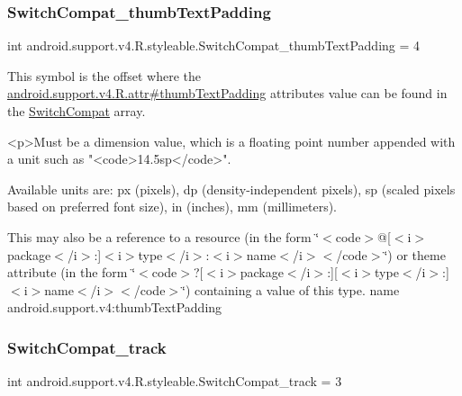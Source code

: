 \subsubsection{\texorpdfstring{Switch\+Compat\+\_\+thumb\+Text\+Padding}{SwitchCompat\_thumbTextPadding}}
{\footnotesize\ttfamily int android.\+support.\+v4.\+R.\+styleable.\+Switch\+Compat\+\_\+thumb\+Text\+Padding = 4\hspace{0.3cm}{\ttfamily [static]}}

This symbol is the offset where the \hyperlink{classandroid_1_1support_1_1v4_1_1R_1_1attr_abc9134fe1050fd996d652ba07079076f}{android.\+support.\+v4.\+R.\+attr\#thumb\+Text\+Padding} attribute\textquotesingle{}s value can be found in the \hyperlink{classandroid_1_1support_1_1v4_1_1R_1_1styleable_a3b46a9ea84acdcc1d9e88a54fc6f685e}{Switch\+Compat} array.

\begin{DoxyVerb}      <p>Must be a dimension value, which is a floating point number appended with a unit such as "<code>14.5sp</code>".
\end{DoxyVerb}
 Available units are\+: px (pixels), dp (density-\/independent pixels), sp (scaled pixels based on preferred font size), in (inches), mm (millimeters). 

This may also be a reference to a resource (in the form \char`\"{}$<$code$>$@\mbox{[}$<$i$>$package$<$/i$>$\+:\mbox{]}$<$i$>$type$<$/i$>$\+:$<$i$>$name$<$/i$>$$<$/code$>$\char`\"{}) or theme attribute (in the form \char`\"{}$<$code$>$?\mbox{[}$<$i$>$package$<$/i$>$\+:\mbox{]}\mbox{[}$<$i$>$type$<$/i$>$\+:\mbox{]}$<$i$>$name$<$/i$>$$<$/code$>$\char`\"{}) containing a value of this type.  name android.\+support.\+v4\+:thumb\+Text\+Padding \mbox{\label{classandroid_1_1support_1_1v4_1_1R_1_1styleable_a4f27b8668dcf466d20fa43564df8cd81}} 
\subsubsection{\texorpdfstring{Switch\+Compat\+\_\+track}{SwitchCompat\_track}}
{\footnotesize\ttfamily int android.\+support.\+v4.\+R.\+styleable.\+Switch\+Compat\+\_\+track = 3\hspace{0.3cm}{\ttfamily [static]}}

